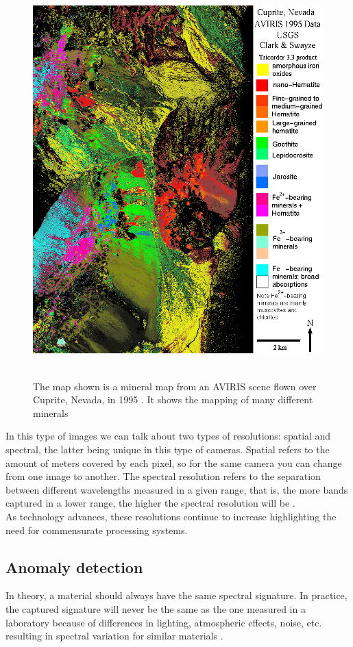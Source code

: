 \begin{figure}[h!]
\centering
\includegraphics[height=6in]{figures/cuprite.png}
\caption{The map shown is a mineral map from an AVIRIS scene flown over Cuprite, Nevada, in 1995 \citep{noauthor_aviris_nodate}. It shows the mapping of many different minerals}
  \label{fig:cuprite}
\end{figure}
\clearpage


In this type of images we can talk about two types of resolutions: spatial and spectral, the latter being unique in this type of cameras. Spatial refers to the amount of meters covered by each pixel, so for the same camera you can change from one image to another. The spectral resolution refers to the separation between different wavelengths measured in a given range, that is, the more bands captured in a lower range, the higher the spectral resolution will be \cite{amigo_chapter_2020}.
\\

As technology advances, these resolutions continue to increase highlighting the need for commensurate processing systems.

\subsection{Anomaly detection}
In theory, a material should always have the same spectral signature. In practice, the captured signature will never be the same as the one measured in a laboratory because of differences in lighting, atmospheric effects, noise, etc. resulting in spectral variation for similar materials \cite{borsoi_spectral_2020}.

